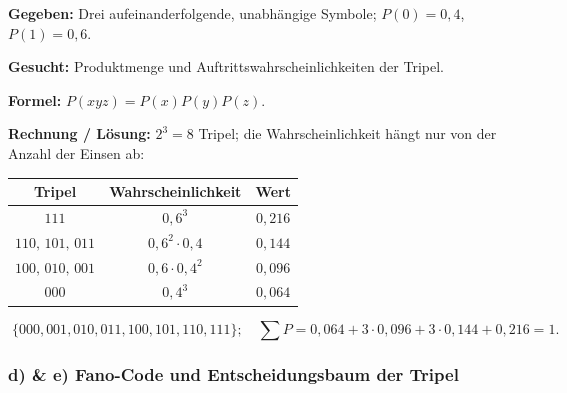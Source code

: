 \begin{beispiel}

\textbf{Gegeben:} Drei aufeinanderfolgende, unabhängige Symbole; $P(0)=0{,}4$,
$P(1)=0{,}6$.

\textbf{Gesucht:} Produktmenge und Auftrittswahrscheinlichkeiten der Tripel.

\textbf{Formel:} $P(xyz) = P(x)P(y)P(z)$.

\textbf{Rechnung / Lösung:} $2^3 = 8$ Tripel; die Wahrscheinlichkeit hängt nur
von der Anzahl der Einsen ab:

\begin{center}
\begin{tabular}{c|c|c}
Tripel & Wahrscheinlichkeit & Wert \\
\hline
$111$ & $0{,}6^3$ & $0{,}216$ \\
$110,\,101,\,011$ & $0{,}6^2\cdot 0{,}4$ & $0{,}144$ \\
$100,\,010,\,001$ & $0{,}6\cdot 0{,}4^2$ & $0{,}096$ \\
$000$ & $0{,}4^3$ & $0{,}064$ \\
\end{tabular}
\end{center}

$$
\boxed{\;\{000,001,010,011,100,101,110,111\};\quad
\textstyle\sum P = 0{,}064 + 3\cdot 0{,}096 + 3\cdot 0{,}144 + 0{,}216 = 1.\;}
$$

\end{beispiel}

\subsubsection*{d) \& e) Fano-Code und Entscheidungsbaum der Tripel}

